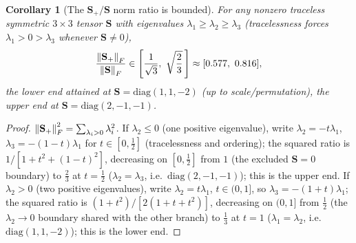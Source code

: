 \documentclass[11pt, a4paper, parskip]{scrartcl}
\theoremstyle{plain}
\newtheorem{corollary}{Corollary}
\theoremstyle{definition}
\theoremstyle{remark}
\newcommand{\Shear}{\mathbf{S}}                           %
\newcommand{\Splus}{\mathbf{S}_{+}}                       %
\begin{document}
\begin{corollary}[The $\Splus/\Shear$ norm ratio is bounded]
\label{cor:shear-regularisation-bound}
For any nonzero traceless symmetric $3\times3$ tensor $\Shear$ with
eigenvalues $\lambda_1\geq\lambda_2\geq\lambda_3$ (tracelessness forces
$\lambda_1>0>\lambda_3$ whenever $\Shear\neq0$),
\begin{equation}
  \frac{\norm{\Splus}_F}{\norm{\Shear}_F} \in
  \left[\frac{1}{\sqrt3},\ \sqrt{\frac23}\,\right] \approx [0.577,\ 0.816] ,
\end{equation}
the lower end attained at $\Shear=\mathrm{diag}(1,1,-2)$ (up to scale/permutation),
the upper end at $\Shear=\mathrm{diag}(2,-1,-1)$.
\end{corollary}
\begin{proof}
$\norm{\Splus}_F^2=\sum_{\lambda_i>0}\lambda_i^2$. If $\lambda_2\leq0$
(one positive eigenvalue), write $\lambda_2=-t\lambda_1$,
$\lambda_3=-(1-t)\lambda_1$ for $t\in[0,\tfrac12]$ (tracelessness and
ordering); the squared ratio is
$1/[1+t^2+(1-t)^2]$, decreasing on $[0,\tfrac12]$ from $1$ (the excluded
$\Shear=0$ boundary) to $\tfrac23$ at $t=\tfrac12$
($\lambda_2=\lambda_3$, i.e.\ $\mathrm{diag}(2,-1,-1)$); this is the upper end.
If $\lambda_2>0$ (two positive eigenvalues), write $\lambda_2=t\lambda_1$,
$t\in(0,1]$, so $\lambda_3=-(1+t)\lambda_1$; the squared ratio is
$(1+t^2)/[2(1+t+t^2)]$, decreasing on $(0,1]$ from $\tfrac12$ (the
$\lambda_2\to0$ boundary shared with the other branch) to $\tfrac13$ at
$t=1$ ($\lambda_1=\lambda_2$, i.e.\ $\mathrm{diag}(1,1,-2)$); this is the lower
end.
\end{proof}
\end{document}
